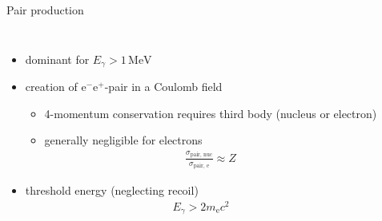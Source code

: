 \documentclass[11pt,xcolor=dvipsnames,professionalfonts,notes]{beamer}
\begin{document}
\begin{frame}{Pair production}
\begin{columns}
	\begin{itemize}
		\setlength\itemsep{1.5em}
		\item dominant for $E_\gamma > 1 \, \mathrm{MeV}$
		
		\item creation of $\mathrm{e}^- \mathrm{e}^+$-pair in a Coulomb field
		\begin{itemize}
			\item 4-momentum conservation requires third body (nucleus or electron)
			\item generally negligible for electrons
			\begin{align*}
				\frac{\sigma_\mathrm{pair,\, nuc}}{\sigma_\mathrm{pair,\, e}} \approx Z
			\end{align*}
		\end{itemize}
		
		\item threshold energy (neglecting recoil)
		\begin{align*}
			E_\gamma > 2 m_\mathrm{e}c^2
		\end{align*}
		
		
	\end{itemize}
	

\end{columns}
\end{frame}
\end{document}
